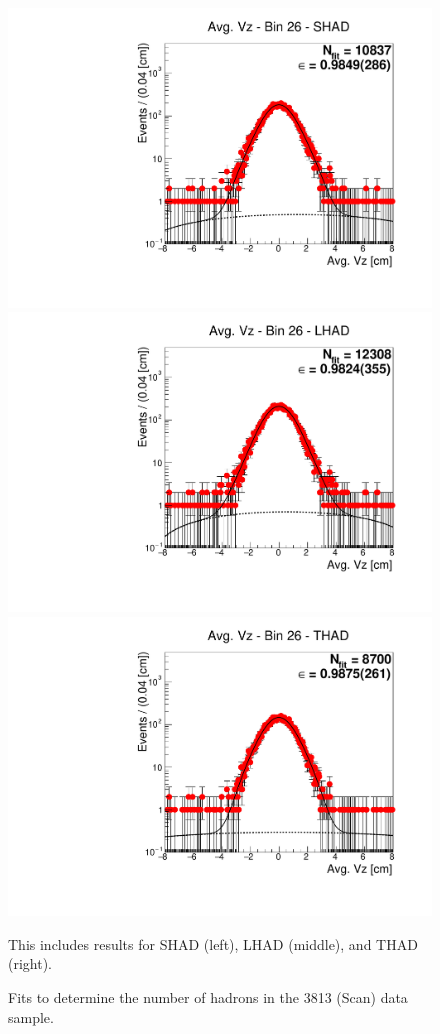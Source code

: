 \begin{figure}[H]
\centering
\includegraphics[scale=0.25]{figures/plots/nonDDbar_fit_results/scan/fit_scan_26_data_SHAD.pdf}
\hspace{-0.5cm}
\includegraphics[scale=0.25]{figures/plots/nonDDbar_fit_results/scan/fit_scan_26_data_LHAD.pdf}
\hspace{-0.5cm}
\includegraphics[scale=0.25]{figures/plots/nonDDbar_fit_results/scan/fit_scan_26_data_THAD.pdf}
\caption{Fits to determine the number of hadrons in the 3813 (Scan) data sample.}
{This includes results for SHAD (left), LHAD (middle), and THAD (right).}
\label{fig:hadron_fits_scan_26}
\end{figure}

